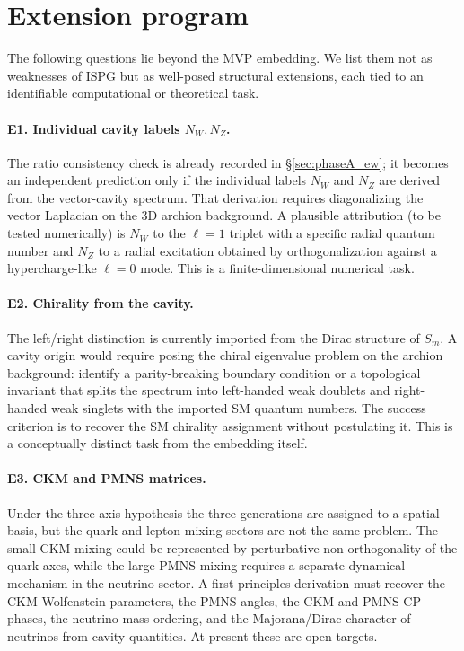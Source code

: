 \documentclass[11pt]{article}
\begin{document}
\section{Extension program}
\label{sec:extension}

The following questions lie beyond the MVP embedding. We list
them not as weaknesses of ISPG but as well-posed structural
extensions, each tied to an identifiable computational or
theoretical task.

\paragraph{E1. Individual cavity labels $N_W, N_Z$.}
The ratio consistency check is already recorded in
\S\ref{sec:phaseA_ew}; it becomes an independent prediction
only if the individual labels $N_W$ and $N_Z$ are derived
from the vector-cavity spectrum.  That derivation requires
diagonalizing the vector Laplacian on the 3D archion
background. A plausible attribution (to be tested numerically)
is $N_W$ to the $\ell=1$ triplet with a
specific radial quantum number and $N_Z$ to a radial excitation
obtained by orthogonalization against a hypercharge-like $\ell=0$
mode. This is a finite-dimensional numerical task.

\paragraph{E2. Chirality from the cavity.}
The left/right distinction is currently imported from the Dirac
structure of $S_m$. A cavity origin would require posing the
chiral eigenvalue problem on the archion background: identify a
parity-breaking boundary condition or a topological invariant
that splits the spectrum into left-handed weak doublets and
right-handed weak singlets with the imported SM quantum numbers.
The success criterion is to recover the SM chirality assignment
without postulating it. This is a conceptually distinct task from
the embedding itself.

\paragraph{E3. CKM and PMNS matrices.}
Under the three-axis hypothesis the three generations are assigned
to a spatial basis, but the quark and lepton mixing sectors are
not the same problem. The small CKM mixing could be represented by
perturbative non-orthogonality of the quark axes, while the large
PMNS mixing requires a separate dynamical mechanism in the
neutrino sector. A first-principles derivation must recover the
CKM Wolfenstein parameters, the PMNS angles, the CKM and PMNS CP
phases, the neutrino mass ordering, and the Majorana/Dirac
character of neutrinos from cavity quantities. At present these
are open targets.
\end{document}
